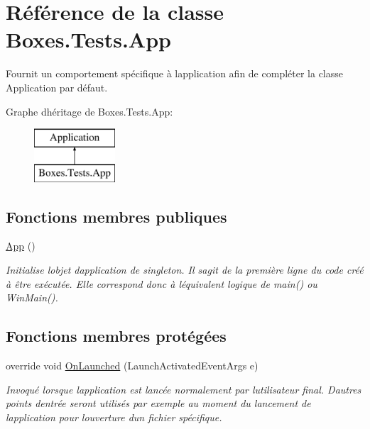 \hypertarget{class_boxes_1_1_tests_1_1_app}{}\section{Référence de la classe Boxes.\+Tests.\+App}
\label{class_boxes_1_1_tests_1_1_app}


Fournit un comportement spécifique à l\textquotesingle{}application afin de compléter la classe Application par défaut.  


Graphe d\textquotesingle{}héritage de Boxes.\+Tests.\+App\+:\begin{figure}[H]
\begin{center}
\leavevmode
\includegraphics[height=2.000000cm]{class_boxes_1_1_tests_1_1_app}
\end{center}
\end{figure}
\subsection*{Fonctions membres publiques}
\begin{DoxyCompactItemize}
\item 
\hyperlink{class_boxes_1_1_tests_1_1_app_a1999af5186e3e336921b3dc46b9043e8}{App} ()
\begin{DoxyCompactList}\small\item\em Initialise l\textquotesingle{}objet d\textquotesingle{}application de singleton. Il s\textquotesingle{}agit de la première ligne du code créé à être exécutée. Elle correspond donc à l\textquotesingle{}équivalent logique de main() ou Win\+Main(). \end{DoxyCompactList}\end{DoxyCompactItemize}
\subsection*{Fonctions membres protégées}
\begin{DoxyCompactItemize}
\item 
override void \hyperlink{class_boxes_1_1_tests_1_1_app_a3afb9340185c08861e8e4d76d5ea17e0}{On\+Launched} (Launch\+Activated\+Event\+Args e)
\begin{DoxyCompactList}\small\item\em Invoqué lorsque l\textquotesingle{}application est lancée normalement par l\textquotesingle{}utilisateur final. D\textquotesingle{}autres points d\textquotesingle{}entrée seront utilisés par exemple au moment du lancement de l\textquotesingle{}application pour l\textquotesingle{}ouverture d\textquotesingle{}un fichier spécifique. \end{DoxyCompactList}\end{DoxyCompactItemize}
